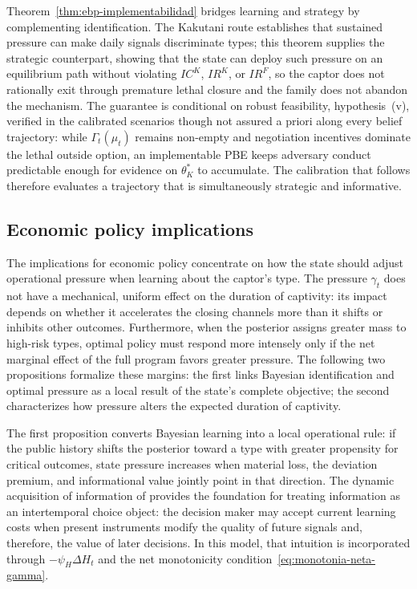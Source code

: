 \documentclass[ecta,nameyear,draft]{econsocart}
\theoremstyle{plain}
\theoremstyle{definition}
\newcommand{\1}{\mathbf{1}}
\begin{document}
\noindent Theorem~\ref{thm:ebp-implementabilidad} bridges learning and strategy by complementing identification. The Kakutani route establishes that sustained pressure can make daily signals discriminate types; this theorem supplies the strategic counterpart, showing that the state can deploy such pressure on an equilibrium path without violating $IC^K$, $IR^K$, or $IR^F$, so the captor does not rationally exit through premature lethal closure and the family does not abandon the mechanism. The guarantee is conditional on robust feasibility, hypothesis~(v), verified in the calibrated scenarios though not assured a priori along every belief trajectory: while $\Gamma_t(\mu_t)$ remains non-empty and negotiation incentives dominate the lethal outside option, an implementable PBE keeps adversary conduct predictable enough for evidence on $\theta_K^\ast$ to accumulate. The calibration that follows therefore evaluates a trajectory that is simultaneously strategic and informative.

\subsection{Economic policy implications}\label{subsec:implicaciones-politica}

\noindent The implications for economic policy concentrate on how the state should adjust operational pressure when learning about the captor's type. The pressure $\gamma_t$ does not have a mechanical, uniform effect on the duration of captivity: its impact depends on whether it accelerates the closing channels more than it shifts or inhibits other outcomes. Furthermore, when the posterior assigns greater mass to high-risk types, optimal policy must respond more intensely only if the net marginal effect of the full program favors greater pressure. The following two propositions formalize these margins: the first links Bayesian identification and optimal pressure as a local result of the state's complete objective; the second characterizes how pressure alters the expected duration of captivity.

\noindent The first proposition converts Bayesian learning into a local operational rule: if the public history shifts the posterior toward a type with greater propensity for critical outcomes, state pressure increases when material loss, the deviation premium, and informational value jointly point in that direction. The dynamic acquisition of information of \citet{Zhong2022} provides the foundation for treating information as an intertemporal choice object: the decision maker may accept current learning costs when present instruments modify the quality of future signals and, therefore, the value of later decisions. In this model, that intuition is incorporated through $-\psi_H\Delta H_t$ and the net monotonicity condition~\eqref{eq:monotonia-neta-gamma}.
\end{document}
